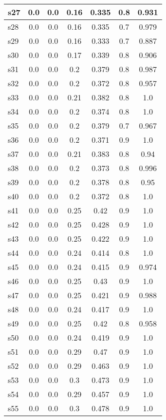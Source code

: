 \documentclass{article}
\begin{document}
\begin{tabular}{|l|c|c|c|c|c|c|}
\hline
s27 &0.0 & 0.0 & 0.16 & 0.335 & 0.8 & 0.931\\
\hline
s28 &0.0 & 0.0 & 0.16 & 0.335 & 0.7 & 0.979\\
\hline
s29 &0.0 & 0.0 & 0.16 & 0.333 & 0.7 & 0.887\\
\hline
s30 &0.0 & 0.0 & 0.17 & 0.339 & 0.8 & 0.906\\
\hline
s31 &0.0 & 0.0 & 0.2 & 0.379 & 0.8 & 0.987\\
\hline
s32 &0.0 & 0.0 & 0.2 & 0.372 & 0.8 & 0.957\\
\hline
s33 &0.0 & 0.0 & 0.21 & 0.382 & 0.8 & 1.0\\
\hline
s34 &0.0 & 0.0 & 0.2 & 0.374 & 0.8 & 1.0\\
\hline
s35 &0.0 & 0.0 & 0.2 & 0.379 & 0.7 & 0.967\\
\hline
s36 &0.0 & 0.0 & 0.2 & 0.371 & 0.9 & 1.0\\
\hline
s37 &0.0 & 0.0 & 0.21 & 0.383 & 0.8 & 0.94\\
\hline
s38 &0.0 & 0.0 & 0.2 & 0.373 & 0.8 & 0.996\\
\hline
s39 &0.0 & 0.0 & 0.2 & 0.378 & 0.8 & 0.95\\
\hline
s40 &0.0 & 0.0 & 0.2 & 0.372 & 0.8 & 1.0\\
\hline
s41 &0.0 & 0.0 & 0.25 & 0.42 & 0.9 & 1.0\\
\hline
s42 &0.0 & 0.0 & 0.25 & 0.428 & 0.9 & 1.0\\
\hline
s43 &0.0 & 0.0 & 0.25 & 0.422 & 0.9 & 1.0\\
\hline
s44 &0.0 & 0.0 & 0.24 & 0.414 & 0.8 & 1.0\\
\hline
s45 &0.0 & 0.0 & 0.24 & 0.415 & 0.9 & 0.974\\
\hline
s46 &0.0 & 0.0 & 0.25 & 0.43 & 0.9 & 1.0\\
\hline
s47 &0.0 & 0.0 & 0.25 & 0.421 & 0.9 & 0.988\\
\hline
s48 &0.0 & 0.0 & 0.24 & 0.417 & 0.9 & 1.0\\
\hline
s49 &0.0 & 0.0 & 0.25 & 0.42 & 0.8 & 0.958\\
\hline
s50 &0.0 & 0.0 & 0.24 & 0.419 & 0.9 & 1.0\\
\hline
s51 &0.0 & 0.0 & 0.29 & 0.47 & 0.9 & 1.0\\
\hline
s52 &0.0 & 0.0 & 0.29 & 0.463 & 0.9 & 1.0\\
\hline
s53 &0.0 & 0.0 & 0.3 & 0.473 & 0.9 & 1.0\\
\hline
s54 &0.0 & 0.0 & 0.29 & 0.457 & 0.9 & 1.0\\
\hline
s55 &0.0 & 0.0 & 0.3 & 0.478 & 0.9 & 1.0\\

\end{tabular}
\end{document}
